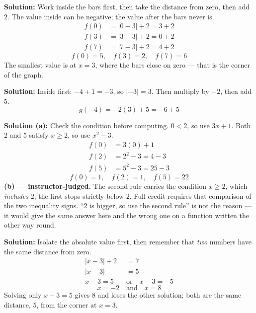 \documentclass[12pt]{article}
\begin{document}




\textbf{Solution:} Work inside the bars first, then take the distance from zero, then add $2$. The value inside can be negative; the value after the bars never is.
\begin{align*}
  f(0) &= |0-3| + 2 = 3 + 2 \\
  f(3) &= |3-3| + 2 = 0 + 2 \\
  f(7) &= |7-3| + 2 = 4 + 2
\end{align*}
\[ \boxed{f(0) = 5, \quad f(3) = 2, \quad f(7) = 6} \]
The smallest value is at $x = 3$, where the bars close on zero --- that is the corner of the graph.


\textbf{Solution:} Inside first: $-4 + 1 = -3$, so $|{-3}| = 3$. Then multiply by $-2$, then add $5$.
\[ g(-4) = -2(3) + 5 = -6 + 5 \]


\textbf{Solution (a):} Check the condition before computing. $0 < 2$, so use $3x+1$. Both $2$ and $5$ satisfy $x \ge 2$, so use $x^2 - 3$.
\begin{align*}
  f(0) &= 3(0) + 1 \\
  f(2) &= 2^2 - 3 = 4 - 3 \\
  f(5) &= 5^2 - 3 = 25 - 3
\end{align*}
\[ \boxed{f(0) = 1, \quad f(2) = 1, \quad f(5) = 22} \]
\textbf{(b) --- instructor-judged.} The second rule carries the condition $x \ge 2$, which \emph{includes} $2$; the first stops strictly below $2$. Full credit requires that comparison of the two inequality signs. ``$2$ is bigger, so use the second rule'' is not the reason --- it would give the same answer here and the wrong one on a function written the other way round.


\textbf{Solution:} Isolate the absolute value first, then remember that \emph{two} numbers have the same distance from zero.
\begin{align*}
  |x-3| + 2 &= 7 \\
  |x-3| &= 5 \\
  x - 3 = 5 \quad &\text{or} \quad x - 3 = -5
\end{align*}
\[ \boxed{x = -2 \quad \text{and} \quad x = 8} \]
Solving only $x - 3 = 5$ gives $8$ and loses the other solution; both are the same distance, $5$, from the corner at $x = 3$.
\end{document}

